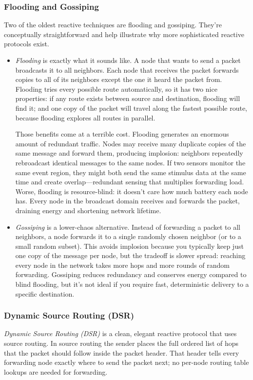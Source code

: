 \subsubsection{Flooding and Gossiping}
Two of the oldest reactive techniques are flooding and gossiping. They’re conceptually straightforward and help illustrate why more sophisticated reactive protocols exist.
\begin{itemize}
    \item \textit{Flooding} is exactly what it sounds like. A node that wants to send a packet broadcasts it to all neighbors. Each node that receives the packet forwards copies to all of its neighbors except the one it heard the packet from. Flooding tries every possible route automatically, so it has two nice properties: if any route exists between source and destination, flooding will find it; and one copy of the packet will travel along the fastest possible route, because flooding explores all routes in parallel.

    Those benefits come at a terrible cost. Flooding generates an enormous amount of redundant traffic. Nodes may receive many duplicate copies of the same message and forward them, producing implosion: neighbors repeatedly rebroadcast identical messages to the same nodes. If two sensors monitor the same event region, they might both send the same stimulus data at the same time and create overlap—redundant sensing that multiplies forwarding load. Worse, flooding is resource-blind: it doesn’t care how much battery each node has. Every node in the broadcast domain receives and forwards the packet, draining energy and shortening network lifetime.

    \item \textit{Gossiping} is a lower-chaos alternative. Instead of forwarding a packet to all neighbors, a node forwards it to a single randomly chosen neighbor (or to a small random subset). This avoids implosion because you typically keep just one copy of the message per node, but the tradeoff is slower spread: reaching every node in the network takes more hops and more rounds of random forwarding. Gossiping reduces redundancy and conserves energy compared to blind flooding, but it’s not ideal if you require fast, deterministic delivery to a specific destination.
\end{itemize}

\subsubsection{Dynamic Source Routing (DSR)}
\textit{Dynamic Source Routing (DSR)} is a clean, elegant reactive protocol that uses source routing. In source routing the sender places the full ordered list of hops that the packet should follow inside the packet header. That header tells every forwarding node exactly where to send the packet next; no per-node routing table lookups are needed for forwarding.

